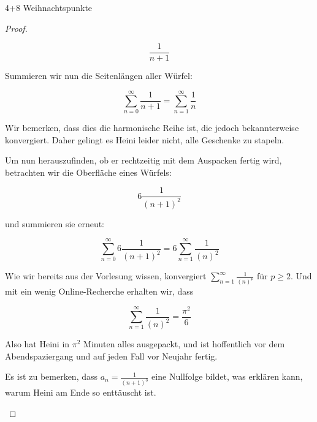 \documentclass{../problemset}
\begin{document}
\begin{problem}[Weihnachtsaufgaben*]{4+8 Weihnachtspunkte}
\begin{proof}
\begin{enumerate}
		      \[
			      \frac{1}{n+1}
		      \]

		      Summieren wir nun die Seitenlängen aller Würfel:

		      \[
			      \sum_{n=0}^{\infty} \frac{1}{n+1} = \sum_{n=1}^{\infty} \frac{1}{n}
		      \]

		      Wir bemerken, dass dies die harmonische Reihe ist, die jedoch bekannterweise konvergiert. Daher gelingt es Heini leider nicht,
		      alle Geschenke zu stapeln.

		      Um nun herauszufinden, ob er rechtzeitig mit dem Auspacken fertig wird, betrachten wir die Oberfläche eines Würfels:

		      \[
			      6 \frac{1}{{(n+1)}^2}
		      \]

		      und summieren sie erneut:

		      \[
			      \sum_{n=0}^{\infty} 6 \frac{1}{{(n+1)}^2} = 6 \sum_{n=1}^{\infty} \frac{1}{{(n)}^2}
		      \]

		      Wie wir bereits aus der Vorlesung wissen, konvergiert $\sum_{n=1}^{\infty} \frac{1}{{(n)}^p}$ für $p \ge 2$. Und mit ein wenig
		      Online-Recherche erhalten wir, dass

		      \[
			      \sum_{n=1}^{\infty} \frac{1}{{(n)}^2} = \frac{\pi^2}{6}
		      \]

		      Also hat Heini in $\pi^2$ Minuten alles ausgepackt, und ist hoffentlich vor dem Abendspaziergang und auf jeden Fall vor Neujahr
		      fertig.

		      Es ist zu bemerken, dass $a_n = \frac{1}{{(n+1)}^3}$ eine Nullfolge bildet, was erklären kann, warum Heini am Ende so enttäuscht
		      ist.

	\end{enumerate}

\end{proof}
\end{problem}
\end{document}
